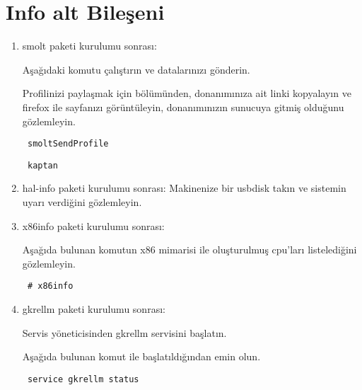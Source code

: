 \documentclass[a4paper,10pt]{article}
\begin{document}
\section{Info alt Bileşeni}
\begin{enumerate}
 \item smolt paketi kurulumu sonrası:

Aşağıdaki komutu çalıştırın ve datalarınızı gönderin.

Profilinizi paylaşmak için bölümünden, donanımınıza ait linki kopyalayın ve firefox ile sayfanızı görüntüleyin, donanımınızın sunucuya gitmiş olduğunu gözlemleyin.

\begin{verbatim}
 smoltSendProfile
\end{verbatim}

\begin{verbatim}
 kaptan
\end{verbatim}

 \item  hal-info paketi kurulumu sonrası:
Makinenize bir usbdisk takın ve sistemin uyarı verdiğini gözlemleyin.

 \item  x86info paketi kurulumu sonrası:

Aşağıda bulunan komutun x86 mimarisi ile oluşturulmuş cpu'ları listelediğini gözlemleyin.
\begin{verbatim}
 # x86info
\end{verbatim}


 \item gkrellm paketi kurulumu sonrası:

Servis yöneticisinden gkrellm servisini başlatın.

Aşağıda bulunan komut ile başlatıldığından emin olun.
\begin{verbatim}
 service gkrellm status
\end{verbatim}

\end{enumerate}
\end{document}
